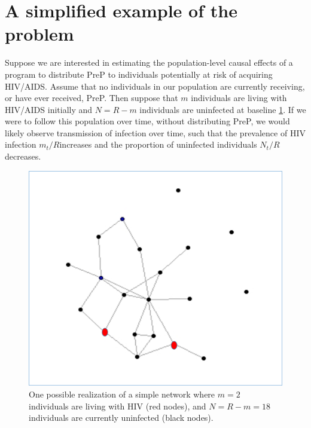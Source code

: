 \documentclass{article}
\theoremstyle{definition}
\begin{document}
\section{A simplified example of the problem}
Suppose we are interested in estimating the population-level causal effects of a program to distribute PreP to individuals potentially at risk of acquiring HIV/AIDS. Assume that no individuals in our population are currently receiving, or have ever received, PreP. Then suppose that $m$ individuals are living with HIV/AIDS initially and $N = R-m$ individuals are uninfected at baseline \ref{fig: Figure 2}. If we were to follow this population over time, without distributing PreP, we would likely observe transmission of infection over time, such that the prevalence of HIV infection $m_t/R$increases and the proportion of uninfected individuals $N_t/R$ decreases. 

\begin{figure}[H]
    \centering
    \includegraphics[scale=0.5]{Figures/Network Example 1.png}
    \caption{One possible realization of a simple network where $m = 2$ individuals are living with HIV (red nodes), and $N=R-m = 18$ individuals are currently uninfected (black nodes).}
    \label{fig: Figure 2}
\end{figure}
\end{document}
